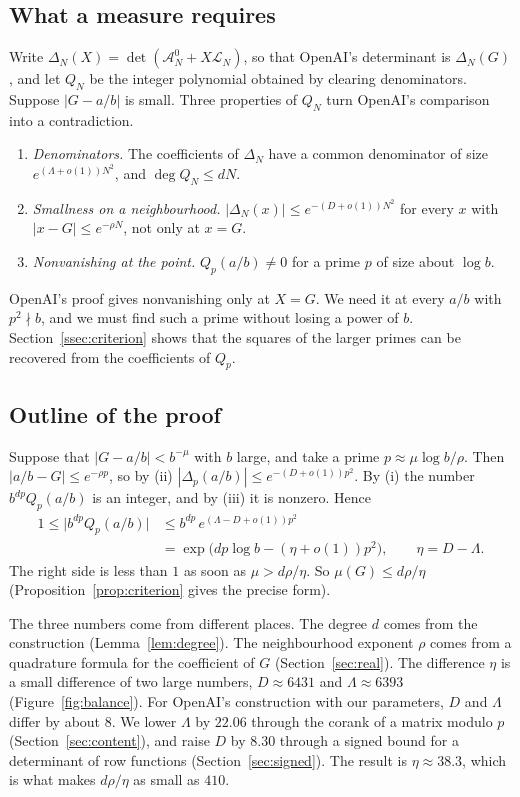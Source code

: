 \documentclass[11pt]{amsart}
\theoremstyle{definition}
\theoremstyle{remark}
\numberwithin{equation}{section}
\newcommand{\cA}{\mathcal A}
\newcommand{\cL}{\mathcal L}
\begin{document}
\subsection{What a measure requires}\label{sec:intro-need}
Write $\Delta_N(X)=\det(\cA^0_N+X\cL_N)$, so that OpenAI's determinant is $\Delta_N(G)$, and let $Q_N$ be
the integer polynomial obtained by clearing denominators. Suppose $|G-a/b|$ is small. Three properties of
$Q_N$ turn OpenAI's comparison into a contradiction.
\begin{enumerate}[label=(\roman*)]
\item \emph{Denominators.} The coefficients of $\Delta_N$ have a common denominator of size
 $e^{(\Lambda+o(1))N^2}$, and $\deg Q_N\le dN$.
\item \emph{Smallness on a neighbourhood.} $|\Delta_N(x)|\le e^{-(D+o(1))N^2}$ for every $x$ with
 $|x-G|\le e^{-\rho N}$, not only at $x=G$.
\item \emph{Nonvanishing at the point.} $Q_p(a/b)\ne0$ for a prime $p$ of size about $\log b$.
\end{enumerate}
OpenAI's proof gives nonvanishing only at $X=G$. We need it at every $a/b$ with $p^2\nmid b$, and we must
find such a prime without losing a power of $b$. Section~\ref{ssec:criterion} shows that the squares of
the larger primes can be recovered from the coefficients of $Q_p$.

\subsection{Outline of the proof}\label{sec:outline}
Suppose that $|G-a/b|<b^{-\mu}$ with $b$ large, and take a prime $p\approx\mu\log b/\rho$. Then
$|a/b-G|\le e^{-\rho p}$, so by (ii) $|\Delta_p(a/b)|\le e^{-(D+o(1))p^2}$. By (i) the number
$b^{dp}Q_p(a/b)$ is an integer, and by (iii) it is nonzero. Hence
\begin{align*}
 1\le\bigl|b^{dp}Q_p(a/b)\bigr|&\le b^{dp}\,e^{(\Lambda-D+o(1))p^2}\\
 &=\exp\bigl(dp\log b-(\eta+o(1))p^2\bigr),\qquad \eta=D-\Lambda .
\end{align*}
The right side is less than $1$ as soon as $\mu>d\rho/\eta$. So $\mu(G)\le d\rho/\eta$
(Proposition~\ref{prop:criterion} gives the precise form).

The three numbers come from different places. The degree $d$ comes from the construction
(Lemma~\ref{lem:degree}). The neighbourhood exponent $\rho$ comes from a quadrature formula for the
coefficient of $G$ (Section~\ref{sec:real}). The difference $\eta$ is a small difference of two large
numbers, $D\approx6431$ and $\Lambda\approx6393$ (Figure~\ref{fig:balance}). For OpenAI's construction with
our parameters, $D$ and $\Lambda$ differ by about $8$. We lower $\Lambda$ by $22.06$ through the corank of
a matrix modulo $p$ (Section~\ref{sec:content}), and raise $D$ by $8.30$ through a signed bound for a
determinant of row functions (Section~\ref{sec:signed}). The result is $\eta\approx38.3$, which is what
makes $d\rho/\eta$ as small as $410$.
\end{document}

